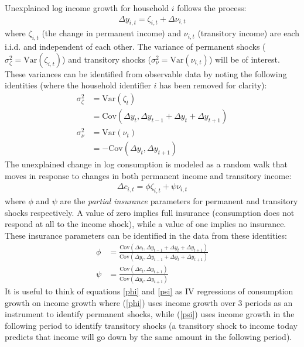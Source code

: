 \documentclass[titlepage]{\econtex}\newcommand{\texname}{BPP_TimeAgg}
\begin{document}
Unexplained log income growth for household $i$ follows the process:
\begin{align*}
\Delta y_{i,t} = \zeta_{i,t} + \Delta \nu_{i,t}
\end{align*}
where $\zeta_{i,t}$ (the change in permanent income) and $\nu_{i,t}$ (transitory income) are each i.i.d. and independent of each other. The variance of permanent shocks ($\sigma^2_{\zeta}=\mathrm{Var}(\zeta_{i,t})$) and transitory shocks ($\sigma^2_{\nu}=\mathrm{Var}(\nu_{i,t})$) will be of interest. These variances can be identified from observable data by noting the following identities (where the household identifier $i$ has been removed for clarity):
\begin{align}
\sigma^2_{\zeta}&=\mathrm{Var}(\zeta_{t}) \nonumber \\
&= \mathrm{Cov}(\Delta y_{t}, \Delta y_{t-1}+\Delta y_{t}+\Delta y_{t+1}) \label{perm_var}\\
\sigma^2_{\nu}&=\mathrm{Var}(\nu_{t}) \nonumber \\
&= -\mathrm{Cov}(\Delta y_{t},\Delta y_{t+1}) \label{tran_var}
\end{align}
The unexplained change in log consumption is modeled as a random walk that moves in response to changes in both permanent income and transitory income:
\begin{align*}
\Delta c_{i,t} = \phi \zeta_{i,t} + \psi \nu_{i,t} 
\end{align*}
where $\phi$ and $\psi$ are the \textit{partial insurance} parameters for permanent and transitory shocks respectively. A value of zero implies full insurance (consumption does not respond at all to the income shock), while a value of one implies no insurance. These insurance parameters can be identified in the data from these identities:
\begin{align}
\phi&= \frac{\mathrm{Cov}(\Delta c_{t}, \Delta y_{t-1}+\Delta y_{t}+\Delta y_{t+1})}{\mathrm{Cov}(\Delta y_{t}, \Delta y_{t-1}+\Delta y_{t}+\Delta y_{t+1})} \label{phi}\\
\psi&= \frac{\mathrm{Cov}(\Delta c_{t},\Delta y_{t+1})}{\mathrm{Cov}(\Delta y_{t},\Delta y_{t+1})} \label{psi}
\end{align}
It is useful to think of equations \ref{phi} and \ref{psi} as IV regressions of consumption growth on income growth where (\ref{phi}) uses income growth over 3 periods as an instrument to identify permanent shocks, while (\ref{psi}) uses income growth in the following period to identify transitory shocks (a transitory shock to income today predicts that income will go down by the same amount in the following period).
\end{document}
